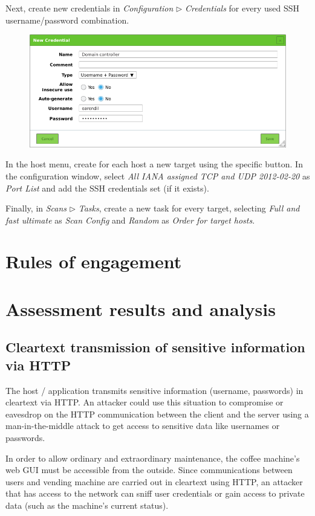 \documentclass[draft]{homework}
\begin{document}
    Next, create new credentials in \textit{Configuration} $\triangleright$ \textit{Credentials} for every used SSH username/password combination.
    \vspace{-5pt}
    \begin{figure}[H]
        \centering
        \includegraphics[width=1\linewidth]{images/new-credentials}
        \label{fig:new-credentials}
    \end{figure}
    \vspace{-20pt}
    
    In the host menu, create for each host a new target using the specific button.
    In the configuration window, select \textit{All IANA assigned TCP and UDP 2012-02-20} as \textit{Port List} and add the SSH credentials set (if it exists).
    
    Finally, in \textit{Scans} $\triangleright$ \textit{Tasks}, create a new task for every target, selecting \textit{Full and fast ultimate} as \textit{Scan Config} and \textit{Random} as \textit{Order for target hosts}.
    
    
    \section{Rules of engagement}
    
    
    \section{Assessment results and analysis}
    \subsection{Cleartext transmission of sensitive information via HTTP}
    \begin{displayquote}
        The host / application transmits sensitive information (username, passwords) in cleartext via HTTP.
        \textelp{}
        An attacker could use this situation to compromise or eavesdrop on the HTTP communication between the client and the server using a man-in-the-middle attack to get access to sensitive data like usernames or passwords.
    \end{displayquote}
    In order to allow ordinary and extraordinary maintenance, the coffee machine's web GUI must be accessible from the outside.
    Since communications between users and vending machine are carried out in cleartext using HTTP, an attacker that has access to the network can sniff user credentials or gain access to private data (such as the machine's current status).
    
\end{document}
